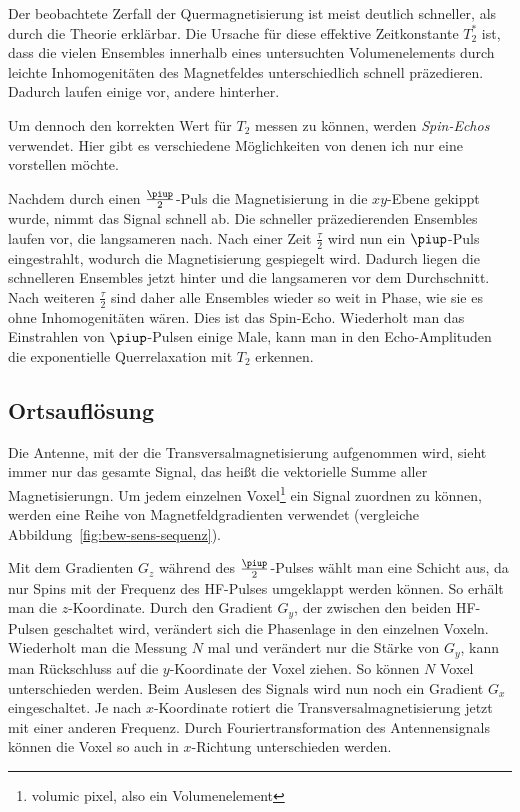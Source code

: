 \documentclass[
    11pt,
    ngerman
]{scrreprt}
\begin{document}
Der beobachtete Zerfall der Quermagnetisierung ist meist deutlich schneller,
als durch die Theorie erklärbar. Die Ursache für diese effektive Zeitkonstante
$T_2^*$ ist, dass die vielen Ensembles innerhalb eines untersuchten
Volumenelements durch leichte Inhomogenitäten des Magnetfeldes unterschiedlich
schnell präzedieren. Dadurch laufen einige vor, andere hinterher.

Um dennoch den korrekten Wert für $T_2$ messen zu können, werden
\emph{Spin-Echos} verwendet. Hier gibt es verschiedene Möglichkeiten von denen
ich nur eine vorstellen möchte.

Nachdem durch einen $\frac\piup2$-Puls die Magnetisierung in die $xy$-Ebene
gekippt wurde, nimmt das Signal schnell ab. Die schneller präzedierenden
Ensembles laufen vor, die langsameren nach. Nach einer Zeit $\frac\tau2$ wird
nun ein $\piup$-Puls eingestrahlt, wodurch die Magnetisierung gespiegelt wird.
Dadurch liegen die schnelleren Ensembles jetzt hinter und die langsameren vor
dem Durchschnitt. Nach weiteren $\frac\tau2$ sind daher alle Ensembles wieder
so weit in Phase, wie sie es ohne Inhomogenitäten wären. Dies ist das
Spin-Echo. Wiederholt man das Einstrahlen von $\piup$-Pulsen einige Male, kann
man in den Echo-Amplituden die exponentielle Querrelaxation mit $T_2$ erkennen.

\subsection{Ortsauflösung}

Die Antenne, mit der die Transversalmagnetisierung aufgenommen wird, sieht
immer nur das gesamte Signal, das heißt die vektorielle Summe aller
Magnetisierungn. Um jedem einzelnen Voxel\footnote{volumic pixel, also ein
Volumenelement} ein Signal zuordnen zu können, werden eine Reihe von
Magnetfeldgradienten verwendet (vergleiche
Abbildung~\ref{fig:bew-sens-sequenz}).

Mit dem Gradienten $G_z$ während des $\frac\piup2$-Pulses wählt man eine
Schicht aus, da nur Spins mit der Frequenz des HF-Pulses umgeklappt werden
können. So erhält man die $z$-Koordinate. Durch den Gradient $G_y$,
der zwischen den beiden HF-Pulsen geschaltet wird, verändert sich die
Phasenlage in den einzelnen Voxeln. Wiederholt man die Messung $N$ mal und
verändert nur die Stärke von $G_y$, kann man Rückschluss auf die $y$-Koordinate
der Voxel ziehen. So können $N$ Voxel unterschieden werden. Beim Auslesen des
Signals wird nun noch ein Gradient $G_x$ eingeschaltet. Je nach $x$-Koordinate
rotiert die Transversalmagnetisierung jetzt mit einer anderen Frequenz. Durch
Fouriertransformation des Antennensignals können die Voxel so auch in
$x$-Richtung unterschieden werden.
\end{document}
